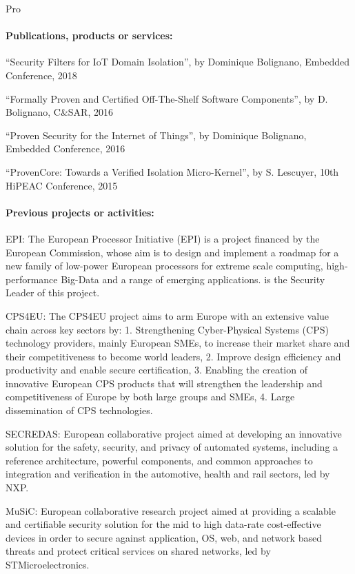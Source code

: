 \begin{sitedescription}{Pro}
\paragraph*{Publications, products or services:}

\begin{compactitem}
\item ``Security Filters for IoT Domain
  Isolation'', by Dominique Bolignano, Embedded Conference, 2018
\item ``Formally Proven and Certified
  Off-The-Shelf Software Components'', by D. Bolignano, C\&SAR,
  2016
\item ``Proven Security for the Internet of
  Things'', by Dominique Bolignano, Embedded Conference, 2016
\item ``ProvenCore: Towards a Verified Isolation
  Micro-Kernel'', by S. Lescuyer, 10th HiPEAC Conference, 2015
\end{compactitem}

\paragraph*{Previous projects or activities:}

\begin{compactitem}
\item EPI: The European Processor Initiative (EPI) is a project
  financed by the European Commission, whose aim is to design and
  implement a roadmap for a new family of low-power European
  processors for extreme scale computing, high-performance Big-Data
  and a range of emerging applications. \provenrun{} is the Security
  Leader of this project.
\item CPS4EU: The CPS4EU project aims to arm Europe with an extensive
  value chain across key sectors by: 1. Strengthening Cyber-Physical
  Systems (CPS) technology providers, mainly European SMEs, to
  increase their market share and their competitiveness to become
  world leaders, 2. Improve design efficiency and productivity and
  enable secure certification, 3. Enabling the creation of innovative
  European CPS products that will strengthen the leadership and
  competitiveness of Europe by both large groups and SMEs, 4. Large
  dissemination of CPS technologies.
\item SECREDAS: European collaborative project aimed at
  developing an innovative solution for the safety, security, and
  privacy of automated systems, including a reference architecture,
  powerful components, and common approaches to integration and
  verification in the automotive, health and rail sectors, led by
  NXP.
\item MuSiC: European collaborative research project aimed at
  providing a scalable and certifiable security solution for the mid
  to high data-rate cost-effective devices in order to secure against
  application, OS, web, and network based threats and protect critical
  services on shared networks, led by STMicroelectronics.
\end{compactitem}


\end{sitedescription}
